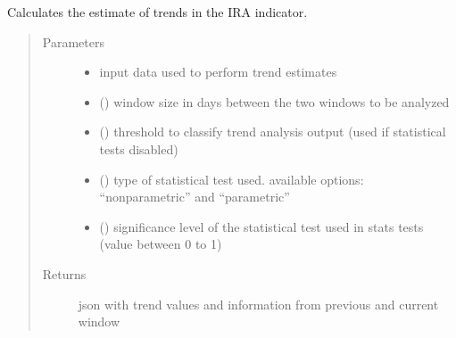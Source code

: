 \documentclass[letterpaper,10pt,english]{sphinxmanual}
\begin{document}
\begin{fulllineitems}
\label{\detokenize{algorithms:algorithms.eti.eti.calc_eti_ira}}
\sphinxAtStartPar
Calculates the estimate of trends in the IRA indicator.
\begin{quote}\begin{description}
\item[{Parameters}] \leavevmode\begin{itemize}
\item {} 
\sphinxAtStartPar
{} \textendash{} input data used to perform trend estimates

\item {} 
\sphinxAtStartPar
{} () \textendash{} window size in days between the two windows to be analyzed

\item {} 
\sphinxAtStartPar
{} () \textendash{} threshold to classify trend analysis output (used if statistical tests disabled)

\item {} 
\sphinxAtStartPar
{} () \textendash{} type of statistical test used. available options: “nonparametric” and “parametric”

\item {} 
\sphinxAtStartPar
{} () \textendash{} significance level of the statistical test used in stats tests (value between 0 to 1)

\end{itemize}

\item[{Returns}] \leavevmode
\sphinxAtStartPar
json with trend values and information from previous and current window

\end{description}\end{quote}

\end{fulllineitems}
\end{document}

